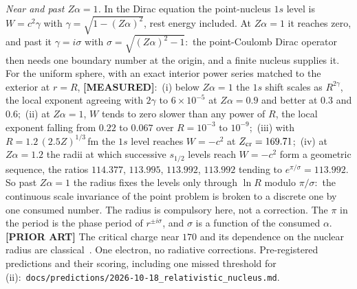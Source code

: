 \documentclass[twocolumn,prc,amsmath,amssymb,superscriptaddress]{revtex4-2}
\begin{document}
\emph{Near and past $Z\alpha = 1$.} In the Dirac equation the point-nucleus $1s$ level is $W = c^2\gamma$ with $\gamma = \sqrt{1 - (Z\alpha)^2}$, rest energy included. At $Z\alpha = 1$ it reaches zero, and past it $\gamma = i\sigma$ with $\sigma = \sqrt{(Z\alpha)^2 - 1}$:\ the point-Coulomb Dirac operator then needs one boundary number at the origin, and a finite nucleus supplies it. For the uniform sphere, with an exact interior power series matched to the exterior at $r = R$, \textbf{[MEASURED]}:\ (i) below $Z\alpha = 1$ the $1s$ shift scales as $R^{2\gamma}$, the local exponent agreeing with $2\gamma$ to $6\times 10^{-5}$ at $Z\alpha = 0.9$ and better at $0.3$ and $0.6$;\ (ii) at $Z\alpha = 1$, $W$ tends to zero slower than any power of $R$, the local exponent falling from $0.22$ to $0.067$ over $R = 10^{-3}$ to $10^{-9}$;\ (iii) with $R = 1.2\,(2.5Z)^{1/3}$\,fm the $1s$ level reaches $W = -c^2$ at $Z_{\rm cr} = 169.71$;\ (iv) at $Z\alpha = 1.2$ the radii at which successive $s_{1/2}$ levels reach $W = -c^2$ form a geometric sequence, the ratios $114.377$, $113.995$, $113.992$, $113.992$ tending to $e^{\pi/\sigma} = 113.992$. So past $Z\alpha = 1$ the radius fixes the levels only through $\ln R$ modulo $\pi/\sigma$:\ the continuous scale invariance of the point problem is broken to a discrete one by one consumed number. The radius is compulsory here, not a correction. The $\pi$ in the period is the phase period of $r^{\pm i\sigma}$, and $\sigma$ is a function of the consumed $\alpha$. \textbf{[PRIOR ART]} The critical charge near $170$ and its dependence on the nuclear radius are classical~\cite{PieperGreiner1969,ZeldovichPopov1972}. One electron, no radiative corrections. Pre-registered predictions and their scoring, including one missed threshold for (ii):\ \texttt{docs/predictions/2026-10-18\_relativistic\_nucleus.md}.
\end{document}
